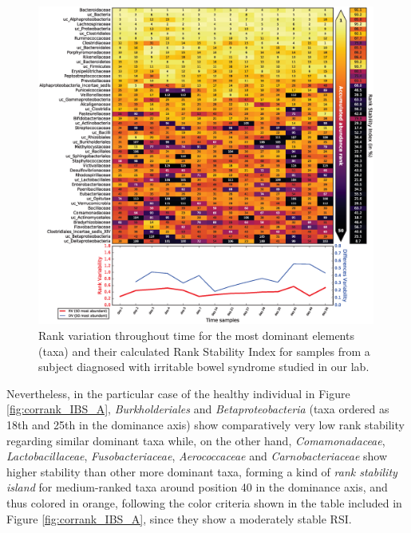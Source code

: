 \begin{figure}
	\centering
	\includegraphics[width=0.99\textwidth]{figs/Fig5.eps}
	\caption{Rank variation throughout time for the most dominant elements (taxa) and their calculated Rank Stability Index for samples from a subject diagnosed with irritable bowel syndrome studied in our lab\cite{IBS}.}
	\label{fig:corrank_IBS_P2}
\end{figure}

Nevertheless, in the particular case of the healthy individual in Figure \ref{fig:corrank_IBS_A}, \emph{Burkholderiales} and \emph{Betaproteobacteria} (taxa ordered as 18th and 25th in the dominance axis) show comparatively very low rank stability regarding similar dominant taxa while, on the other hand, \emph{Comamonadaceae}, \emph{Lactobacillaceae}, \emph{Fusobacteriaceae}, \emph{Aerococcaceae} and \emph{Carnobacteriaceae} show higher stability than other more dominant taxa, forming a kind of \emph{rank stability island} for medium-ranked taxa around position 40 in the dominance axis, and thus colored in orange, following the color criteria shown in the table included in Figure \ref{fig:corrank_IBS_A}, since they show a moderately stable RSI.

